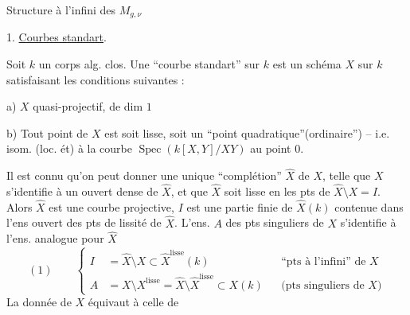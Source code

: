 Structure à l'infini des $M_{g,\nu}$

1. \uline{Courbes standart}.

Soit $k$ un corps alg. clos. Une ``courbe standart'' sur $k$ est un schéma $X$ sur $k$ satisfaisant les conditions suivantes :

a) $X$ quasi-projectif,  de dim $1$

b) Tout point de $X$ est soit lisse, soit un ``point quadratique''(ordinaire'') -- i.e. isom. (loc. ét) à  la courbe $\operatorname{Spec}(k[X,Y]/XY)$ au point $0$.

Il est connu qu'on peut donner une unique ``complétion'' $\widehat X$ de $X$, telle que  $X$ s'identifie à un ouvert dense de $\widehat X$, et que $\widehat X$ soit lisse en les pts de $\widehat X\setminus X=I$. Alors $\widehat X$ est une courbe projective, $I$ est  une partie finie de $\widehat X(k)$ contenue dans l'ens ouvert des pts de lissité de $\widehat X$. L'ens. $A$ des pts singuliers de $X$ s'identifie à l'ens. analogue pour $\widehat X$
\[
(1)\qquad
\left\{\begin{aligned}
I&=\widehat X\setminus X\subset\widehat X^{\mathrm{lisse}}(k)
&&\text{``pts à l'infini'' de }X\\
A&=X\setminus X^{\mathrm{lisse}}=\widehat X\setminus\widehat X^{\mathrm{lisse}}\subset X(k)
&&\text{(pts singuliers de }X\text{)}
\end{aligned}\right.
\]
La donnée de $X$ équivaut à celle de
